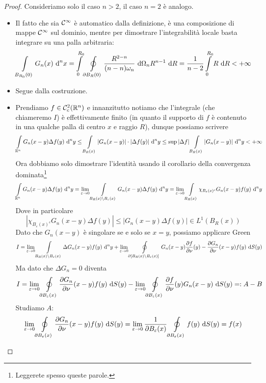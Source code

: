 \documentclass{book}
\begin{document}
\begin{proof}
    Consideriamo solo il caso $n>2$, il caso $n=2$ è analogo.\begin{itemize}
        \item Il fatto che sia $\mathcal{C}^\infty$ è automatico dalla definizione, è una composizione di mappe $\mathcal{C}^\infty$ sul dominio, mentre per dimostrare l'integrabilità locale basta integrare su una palla arbitraria:
        \[\int\limits_{B_{R_0}(0)} G_n(x)\text{ d}^n x = \int\limits_0^{R_0} \oint\limits_{\partial B_R(0)}\frac{R^{2-n}}{(n-n)\omega_n}\text{ d}\Omega_n R^{n-1}\text{ d} R = \frac{1}{n-2}\int\limits_0^{R_0} R\text{ d} R < +\infty\]
        \item Segue dalla costruzione.
        \item Prendiamo $f\in\mathcal{C}^2_c(\mathbb{R}^n)$ e innanzitutto notiamo che l'integrale (che chiameremo $I$) è effettivamente finito (in quanto il supporto di $f$ è contenuto in una qualche palla di centro $x$ e raggio $R$), dunque possiamo scrivere
        \[ \int\limits_{\mathbb{R}^n} G_n(x-y)\Delta f(y) \text{ d}^n y \le \int\limits_{B_R(x)}|G_n(x-y)|\cdot |\Delta f(y)|\text{ d}^n y \le \sup|\Delta f|\int\limits_{B_R(x)} |G_n(x-y)|\text{ d}^n y < +\infty  \]
        Ora dobbiamo solo dimostrare l'identità usando il corollario della convergenza dominata\footnote{Leggerete spesso queste parole.}
        \[\int\limits_{\mathbb{R}^n} G_n(x-y)\Delta f(y) \text{ d}^n y = \lim_{\varepsilon \to 0} \int\limits_{B_R(x)\setminus B_\varepsilon(x)}G_n(x-y)\Delta f(y) \text{ d}^n y = \lim_{\varepsilon\to 0} \int\limits_{B_R(x)} \chi_{B_\varepsilon(x)^c}G_n(x-y)f(y)\text{ d}^n y\]
        Dove in particolare
        \[|\chi_{B_\varepsilon(x)^c}G_n(x-y)\Delta f(y)|\le|G_n(x-y)\Delta f(y)| \in L^1(B_R(x))\]
        Dato che $G_n(x-y)$ è singolare se e solo se $x=y$, possiamo applicare Green
        \[I = \lim_{\varepsilon \to 0} \int\limits_{B_R(x)\setminus B_\varepsilon(x)}\Delta G_n(x-y) f(y) \text{ d}^n y + \lim_{\varepsilon\to 0} \oint\limits_{\partial [B_R(x)\setminus B_\varepsilon(x)]} G_n(x-y)\frac{\partial f}{\partial \nu}(y) - \frac{\partial G_n}{\partial \nu}(x-y) f(y)\text{ d} S(y)\]
        Ma dato che $\Delta G_n= 0$ diventa
        \[I=\lim_{\varepsilon\to 0}\oint\limits_{\partial B_\varepsilon(x)}\frac{\partial G_n}{\partial \nu}(x-y)f(y)\text{ d} S(y) - \lim_{\varepsilon\to 0}\oint\limits_{\partial B_\varepsilon(x)}\frac{\partial f}{\partial \nu}(y)G_n(x-y)\text{ d} S(y) =: A-B\]
        Studiamo $A$:
        \[\lim_{\varepsilon\to 0}\oint\limits_{\partial B_\varepsilon(x)}\frac{\partial G_n}{\partial \nu}(x-y)f(y)\text{ d} S(y) = \lim_{\varepsilon\to 0} \frac{1}{\partial B_\varepsilon(x)}\oint\limits_{\partial B_\varepsilon(x)}f(y)\text{ d} S(y) = f(x)\]

\end{itemize}
\end{proof}
\end{document}
